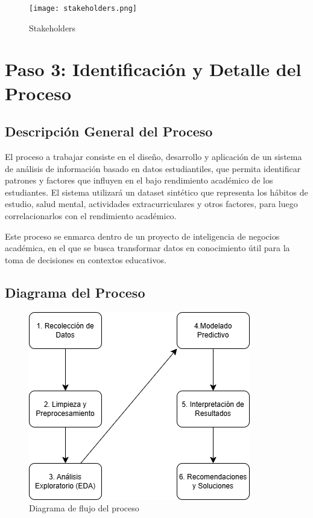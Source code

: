 \documentclass[12pt,letterpaper]{report}
\begin{document}
\begin{figure}[!ht]
    \centering
    \texttt{[image: stakeholders.png]}
    \caption{Stakeholders}
    \label{fig:grafico1}
\end{figure}

\section{Paso 3: Identificación y Detalle del Proceso}

\subsection{Descripción General del Proceso}
El proceso a trabajar consiste en el diseño, desarrollo y aplicación de un sistema de análisis de información basado en datos estudiantiles, que permita identificar patrones y factores que influyen en el bajo rendimiento académico de los estudiantes. El sistema utilizará un dataset sintético que representa los hábitos de estudio, salud mental, actividades extracurriculares y otros factores, para luego correlacionarlos con el rendimiento académico.

Este proceso se enmarca dentro de un proyecto de inteligencia de negocios académica, en el que se busca transformar datos en conocimiento útil para la toma de decisiones en contextos educativos.

\subsection{Diagrama del Proceso}

\begin{figure}
    \centering
    \includegraphics[width=0.5\linewidth]{diagrama de flujo.drawio.png}
    \caption{Diagrama de flujo del proceso}
    \label{fig:enter-label}
\end{figure}
\end{document}
